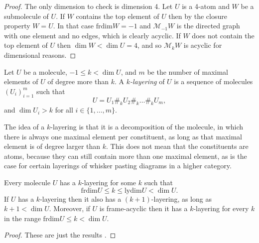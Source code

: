 \documentclass[12pt,a4paper]{article}
\numberwithin{equation}{section}
\begin{document}
\begin{proof}
    The only dimension to check is dimension 4. Let $U$ is a 4-atom and $W$ be a submolecule of $U$. If $W$ contains the top element of $U$ then by the closure property $W = U$. In that case $\mathrm{frdim} W = -1$ and $\mathscr{M}_{-1} W$ is the directed graph with one element and no edges, which is clearly acyclic. If $W$ does not contain the top element of $U$ then $\dim W < \dim U = 4$, and so $\mathscr{M}_k W$ is acyclic for dimensional reasons.
\end{proof}

\begin{definition}
    Let $U$ be a molecule, $-1 \leq k < \dim U$, and $m$ be the number of maximal elements of $U$ of degree more than $k$. A \emph{$k$-layering} of $U$ is a sequence of molecules $(U_i)_{i=1}^m$ such that
    \begin{equation}
        U = U_1 \#_k U_2 \#_k \dots \#_k U_m,
    \end{equation}
    and $\dim U_i > k$ for all $i \in \{1, \dots, m\}$.
\end{definition}

\begin{remark}
    The idea of a $k$-layering is that it is a decomposition of the molecule, in which there is always one maximal element per constituent, as long as that maximal element is of degree larger than $k$. This does not mean that the constituents are atoms, because they can still contain more than one maximal element, as is the case for certain layerings of whisker pasting diagrams in a higher category.
\end{remark}

\begin{proposition}\label{prop:layering_existence}
    Every molecule $U$ has a $k$-layering for some $k$ such that
    \begin{equation}
        \mathrm{frdim} U \leq k \leq \mathrm{lydim} U < \dim U.
    \end{equation}
    If $U$ has a $k$-layering then it also has a $(k+1)$-layering, as long as $k+1 < \dim U$. Moreover, if $U$ is frame-acyclic then it has a $k$-layering for every $k$ in the range $\mathrm{frdim} U \leq k < \dim U$.
\end{proposition}

\begin{proof}
    These are just the results \cite[Lem.\,4.2.6, Thm.\,4.2.12, Cor.\,4.4.6, Thm.\,8.1.4]{hadzihasanovic}.
\end{proof}
\end{document}
